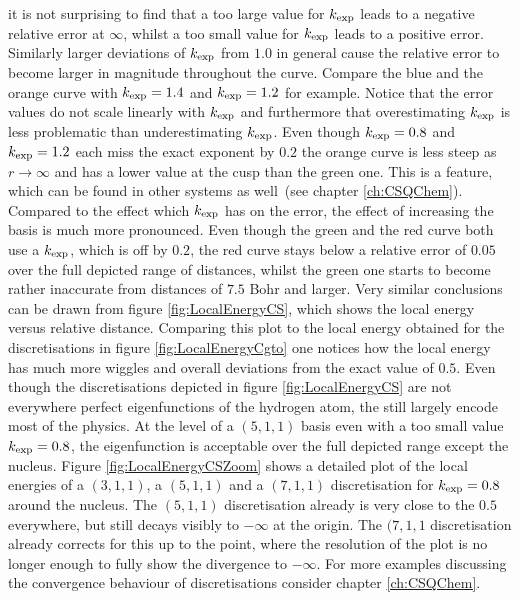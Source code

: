 it is not surprising to find that
a too large value for $k_\text{exp}$ leads to a negative relative error at $\infty$,
whilst a too small value for $k_\text{exp}$ leads to a positive error.
Similarly larger deviations of $k_\text{exp}$ from $1.0$
in general cause the relative error to become larger in magnitude
throughout the curve.
Compare the blue and the orange curve with $k_\text{exp} = 1.4$ and $k_\text{exp} = 1.2$
for example.
Notice that the error values do not scale linearly with $k_\text{exp}$
and furthermore
that overestimating $k_\text{exp}$ is less problematic than underestimating $k_\text{exp}$.
Even though $k_\text{exp} = 0.8$ and $k_\text{exp} = 1.2$ each miss the exact exponent
by $0.2$ the orange curve is less steep as $r\to\infty$ and has a lower value
at the cusp than the green one.
This is a feature, which can be found in other systems as
well~(see chapter \vref{ch:CSQChem}).
Compared to the effect which $k_\text{exp}$ has on the error,
the effect of increasing the basis is much more pronounced.
Even though the green and the red curve both use a $k_\text{exp}$,
which is off by $0.2$,
the red curve stays below a relative error of $0.05$
over the full depicted range of distances,
whilst the green one starts to become rather inaccurate from distances
of $7.5$ Bohr and larger.
Very similar conclusions can be drawn
from figure \vref{fig:LocalEnergyCS},
which shows the local energy versus relative distance.
Comparing this plot to the local energy obtained for the \cGTO
discretisations in figure \vref{fig:LocalEnergyCgto}
one notices how the \cGTO local energy has much more wiggles
and overall deviations from the exact value of $0.5$.
Even though the \CS discretisations depicted
in figure \ref{fig:LocalEnergyCS} are not everywhere perfect eigenfunctions
of the hydrogen atom,
the still largely encode most of the physics.
At the level of a $(5,1,1)$ basis even with a too small value $k_\text{exp} = 0.8$,
the eigenfunction is acceptable over the full depicted range
except the nucleus.
Figure \ref{fig:LocalEnergyCSZoom} shows a detailed plot
of the local energies of a $(3,1,1)$, a $(5,1,1)$
and a $(7,1,1)$ discretisation for $k_\text{exp} = 0.8$
around the nucleus.
The $(5,1,1)$ discretisation already is very close to the $0.5$ everywhere,
but still decays visibly to $-\infty$ at the origin.
The $(7,1,1$ discretisation already corrects for this
up to the point, where the resolution of the plot is no longer
enough to fully show the divergence to $-\infty$.
For more examples discussing the convergence behaviour of
\CS discretisations consider chapter \vref{ch:CSQChem}.




